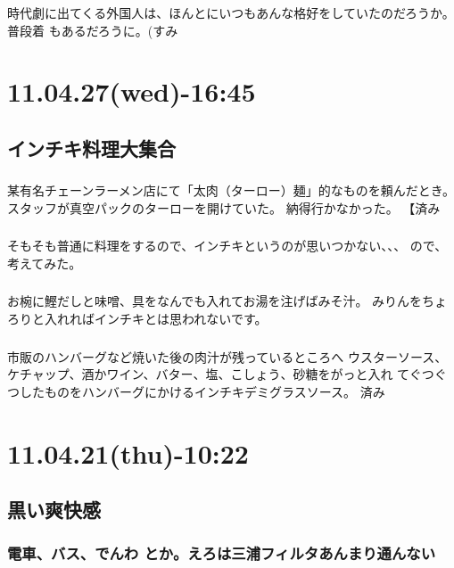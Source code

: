 \documentclass[11pt]{article}
\begin{document}
時代劇に出てくる外国人は、ほんとにいつもあんな格好をしていたのだろうか。普段着
もあるだろうに。(すみ
\subsubsection{}
\section{11.04.27(wed)-16:45}
\label{sec-129}
\subsection{インチキ料理大集合}
\label{sec-129_1}
\subsubsection{}

某有名チェーンラーメン店にて「太肉（ターロー）麺」的なものを頼んだとき。
スタッフが真空パックのターローを開けていた。
納得行かなかった。 【済み
\subsubsection{}

そもそも普通に料理をするので、インチキというのが思いつかない、、、
ので、考えてみた。
\subsubsection{}

お椀に鰹だしと味噌、具をなんでも入れてお湯を注げばみそ汁。
みりんをちょろりと入れればインチキとは思われないです。
\subsubsection{}

市販のハンバーグなど焼いた後の肉汁が残っているところへ
ウスターソース、ケチャップ、酒かワイン、バター、塩、こしょう、砂糖をがっと入れ
てぐつぐつしたものをハンバーグにかけるインチキデミグラスソース。 済み
\section{11.04.21(thu)-10:22}
\label{sec-130}
\subsection{黒い爽快感}
\label{sec-130_1}
\subsubsection{電車、バス、でんわ とか。えろは三浦フィルタあんまり通んない}
\label{sec-130_1_1}
\end{document}
